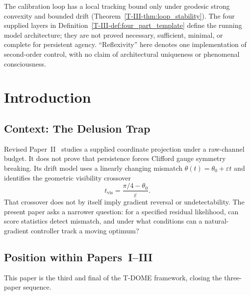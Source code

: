 \documentclass[12pt,a4paper,openany]{book}
\begin{document}
The calibration loop has a local tracking bound only under geodesic
strong convexity and bounded drift (Theorem~\ref{T-III-thm:loop_stability}).
The four supplied layers in Definition~\ref{T-III-def:four_part_template}
define the running model architecture; they are not proved necessary,
sufficient, minimal, or complete for persistent agency.  ``Reflexivity''
here denotes one implementation of second-order control, with no claim of
architectural uniqueness or phenomenal consciousness.


\section{Introduction}
\label{T-III-sec:intro}

\subsection{Context: The Delusion Trap}
\label{T-III-subsec:delusion_context}

Revised Paper~II~\cite{Liu2026TDOME_II} studies a supplied
coordinate projection under a raw-channel budget.  It does not prove
that persistence forces Clifford gauge symmetry breaking.  Its drift
model uses a linearly changing mismatch
$\theta(t)=\theta_0+\varepsilon t$ and identifies the geometric
visibility crossover
\begin{equation}
\label{T-III-eq:t_del_recall}
t_{\mathrm{vis}}
=\frac{\pi/4-\theta_0}{\varepsilon}.
\end{equation}
That crossover does not by itself imply gradient reversal or
undetectability.  The present paper asks a narrower question: for a
specified residual likelihood, can score statistics detect mismatch,
and under what conditions can a natural-gradient controller track a
moving optimum?

\subsection{Position within Papers~I--III}
\label{T-III-subsec:sequence}

This paper is the third and final of the T-DOME framework,
closing the three-paper sequence.
\end{document}
